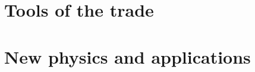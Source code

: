 \documentclass[ twoside,openright,titlepage,numbers=noenddot,%
headinclude,footinclude,cleardoublepage=empty,abstract=on,
BCOR=5mm,paper=a4,fontsize=11pt
]{scrreprt}
\begin{document}
\part{Tools of the trade}\label{pt:tools}


\newpage
\cleardoublepage
\part{New physics and applications}\label{pt:applications}

\newpage


\appendix
%

\cleardoublepage
\cleardoublepage
\cleardoublepage
\newpage
\end{document}
